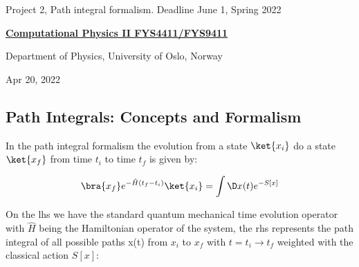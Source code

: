 \documentclass[%
oneside,                 %
final,                   %
10pt]{article}
\begin{document}

\newcommand{\exercisesection}[1]{\subsection*{#1}}






\thispagestyle{empty}

\begin{center}
{\LARGE\bf
\begin{spacing}{1.25}
Project 2, Path integral formalism. Deadline June 1, Spring 2022
\end{spacing}
}
\end{center}


\begin{center}
{\bf \href{{http://www.uio.no/studier/emner/matnat/fys/FYS4411/index-eng.html}}{Computational Physics II FYS4411/FYS9411}}
\end{center}

    \begin{center}
\centerline{{\small Department of Physics, University of Oslo, Norway}}
\end{center}
    

\begin{center}
Apr 20, 2022
\end{center}

\vspace{1cm}


\subsection{Path Integrals: Concepts and Formalism}

In the path integral formalism the evolution from a state $\ket{x_i}$ do a state $\ket{x_f}$ from time $t_i$ to time $t_f$ is given by:

\[
	\bra{x_f}e^{-\hat{H}(t_f-t_i)}\ket{x_i} = \int \D x(t) e^{-S[x]}
\]

On the lhs we have the standard quantum mechanical time evolution operator with $\hat{H}$ being the Hamiltonian operator of the system, the rhs represents the path integral of all possible paths x(t) from $x_i$ to $x_f$ with $t = t_i \rightarrow t_f$ weighted with the classical action $S[x]$:
\end{document}
